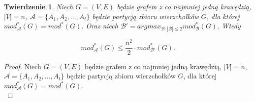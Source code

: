 \documentclass[letterpaper,12pt]{article}
\newtheorem{theorem}{Twierdzenie}
\begin{document}
\begin{theorem}
  \label{dinh_thai_star}
  Niech \(G = (V,E)\) będzie grafem z co najmniej jedną krawędzią, \(|V|=n\), \(\mathcal{A} = \{A_1, A_2, \ldots, A_t\}\) będzie partycją zbioru wierzchołków \(G\), dla której \(mod_{\mathcal{A}}^*(G) = mod^*(G)\). Oraz niech \(\mathcal{B'} = argmax_{\mathcal{B}:|\mathcal{B}|\leq 2}mod_{\mathcal{B}}^*(G)\). Wtedy

  \[mod_{\mathcal{A}}^*(G) \leq \frac{n^2}{2} \cdot mod_{\mathcal{B'}}^*(G).\]
\end{theorem}

\begin{proof}
  Niech \(G = (V,E)\) będzie grafem z co najmniej jedną krawędzią, \(|V|=n\), \(\mathcal{A} = \{A_1, A_2, \ldots, A_t\}\) będzie partycją zbioru wierzchołków \(G\), dla której \(mod_{\mathcal{A}}^*(G) = mod^*(G)\).\\


\end{proof}
\end{document}
